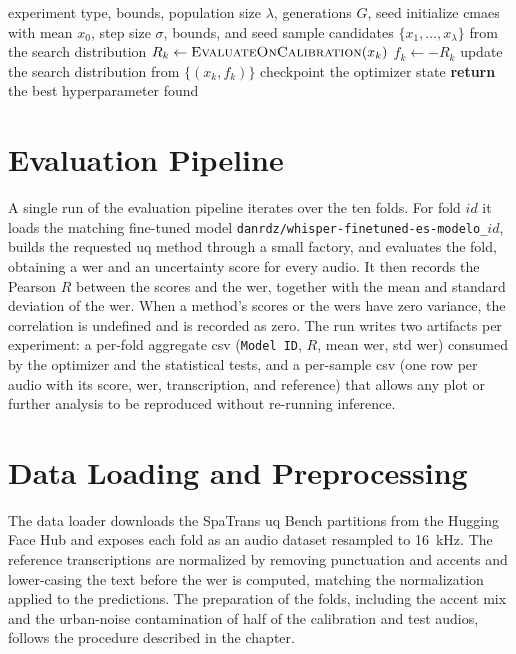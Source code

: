 \begin{algorithm}[ht]
	\caption{CMA-ES hyperparameter search}
	\label{alg:cmaes}
	\begin{algorithmic}[1]
		\Require experiment type, bounds, population size $\lambda$, generations $G$, seed
		\State initialize \acrshort{cmaes} with mean $x_0$, step size $\sigma$, bounds, and seed
		\State sample candidates $\{x_1,\dots,x_\lambda\}$ from the search distribution
		\State $R_k \gets \textsc{EvaluateOnCalibration}(x_k)$ 
		\State $f_k \gets -R_k$
		\EndFor
		\State update the search distribution from $\{(x_k, f_k)\}$
		\State checkpoint the optimizer state
		\EndFor
		\State \textbf{return} the best hyperparameter found
	\end{algorithmic}
\end{algorithm}

\section{Evaluation Pipeline}

A single run of the evaluation pipeline iterates over the ten folds. For fold $id$ it loads the matching fine-tuned model \texttt{danrdz/whisper-finetuned-es-modelo\_$id$}, builds the requested \acrshort{uq} method through a small factory, and evaluates the fold, obtaining a \acrshort{wer} and an uncertainty score for every audio. It then records the Pearson $R$ between the scores and the \acrshort{wer}, together with the mean and standard deviation of the \acrshort{wer}. When a method's scores or the \acrshort{wer}s have zero variance, the correlation is undefined and is recorded as zero. The run writes two artifacts per experiment: a per-fold aggregate \acrshort{csv} (\texttt{Model ID}, $R$, mean \acrshort{wer}, std \acrshort{wer}) consumed by the optimizer and the statistical tests, and a per-sample \acrshort{csv} (one row per audio with its score, \acrshort{wer}, transcription, and reference) that allows any plot or further analysis to be reproduced without re-running inference.

\section{Data Loading and Preprocessing}

The data loader downloads the SpaTrans \acrshort{uq} Bench partitions from the Hugging Face Hub and exposes each fold as an audio dataset resampled to \qty{16}{\kilo\hertz}. The reference transcriptions are normalized by removing punctuation and accents and lower-casing the text before the \acrshort{wer} is computed, matching the normalization applied to the predictions. The preparation of the folds, including the accent mix and the urban-noise contamination of half of the calibration and test audios, follows the procedure described in the  chapter.

